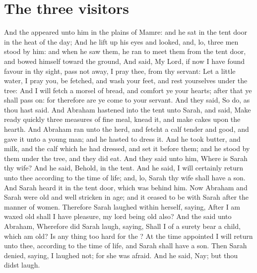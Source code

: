 \section*{The three visitors}
\begin{biblechapter} %
\verse And the \LORD appeared unto him in the plains of Mamre: and he sat in the tent door in the heat of the day;
\verse And he lift up his eyes and looked, and, lo, three men stood by him: and when he saw them, he ran to meet them from the tent door, and bowed himself toward the ground,
\verse And said, My Lord, if now I have found favour in thy sight, pass not away, I pray thee, from thy servant:
\verse Let a little water, I pray you, be fetched, and wash your feet, and rest yourselves under the tree:
\verse And I will fetch a morsel of bread, and comfort ye your hearts; after that ye shall pass on: for therefore are ye come to your servant. And they said, So do, as thou hast said.
\verse And Abraham hastened into the tent unto Sarah, and said, Make ready quickly three measures of fine meal, knead it, and make cakes upon the hearth.
\verse And Abraham ran unto the herd, and fetcht a calf tender and good, and gave it unto a young man; and he hasted to dress it.
\verse And he took butter, and milk, and the calf which he had dressed, and set it before them; and he stood by them under the tree, and they did eat.
\verse And they said unto him, Where is Sarah thy wife? And he said, Behold, in the tent.
\verse And he said, I will certainly return unto thee according to the time of life; and, lo, Sarah thy wife shall have a son. And Sarah heard it in the tent door, which was behind him.
\verse Now Abraham and Sarah were old and well stricken in age; and it ceased to be with Sarah after the manner of women.
\verse Therefore Sarah laughed within herself, saying, After I am waxed old shall I have pleasure, my lord being old also?
\verse And the \LORD said unto Abraham, Wherefore did Sarah laugh, saying, Shall I of a surety bear a child, which am old?
\verse Is any thing too hard for the \LORD? At the time appointed I will return unto thee, according to the time of life, and Sarah shall have a son.
\verse Then Sarah denied, saying, I laughed not; for she was afraid. And he said, Nay; but thou didst laugh.

\end{biblechapter}
